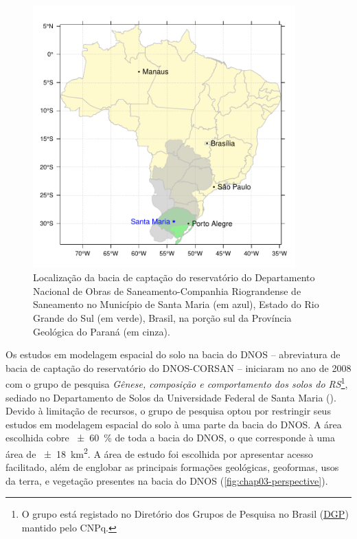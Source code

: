 \begin{figure}[!ht]
\centering
\includegraphics[width=0.90\textwidth]{fig/chap03-location}
\caption[Localização da bacia de captação do reservatório do DNOS-CORSAN, em Santa Maria, RS, 
Brasil]{Localização da bacia de captação do reservatório do Departamento Nacional de Obras de 
Saneamento-Companhia Riograndense de Saneamento no Município de Santa Maria (em azul), Estado do Rio 
Grande do Sul (em verde), Brasil, na porção sul da Província Geológica do Paraná (em cinza).}
\label{fig:chap03-location}
\end{figure}

\def\footsolosdors{\footnote{O grupo está registado no Diretório dos Grupos de Pesquisa no Brasil 
(\href{http://dgp.cnpq.br/dgp/espelhogrupo/9373361709890764}{DGP}) mantido pelo CNPq.}}

Os estudos em modelagem espacial do solo na bacia do DNOS -- abreviatura de bacia de captação do reservatório 
do DNOS-CORSAN -- iniciaram no ano de \num{2008} com o grupo de pesquisa \emph{Gênese, composição e 
comportamento dos solos do RS}\footsolosdors{}, sediado no Departamento de Solos da Universidade Federal de 
Santa Maria (\ufsm). Devido à limitação de recursos, o grupo de pesquisa optou por restringir seus estudos em 
modelagem espacial do solo à uma parte da bacia do DNOS. A área escolhida cobre \SI{\pm60}{\percent} de toda a 
bacia do DNOS, o que corresponde à uma área de \SI{\pm18}{\square\kilo\metre}. A área de estudo foi escolhida 
por apresentar acesso facilitado, além de englobar as principais formações geológicas, geoformas, usos da 
terra, e vegetação presentes na bacia do DNOS (\autoref{fig:chap03-perspective}).


